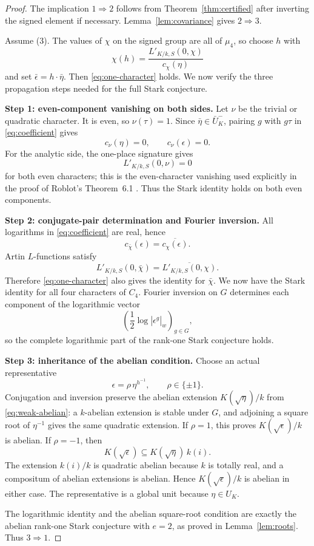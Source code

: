 \documentclass[11pt]{article}
\newcommand{\Lprime}{L'_{K/k,S}}
\begin{document}
\begin{proof}
The implication \(1\Rightarrow2\) follows from
Theorem~\ref{thm:certified} after inverting the signed element if
necessary.  Lemma~\ref{lem:covariance} gives \(2\Rightarrow3\).

Assume (3).  The values of \(\chi\) on the signed group are all of
\(\mu_4\), so choose \(h\) with
\[
\chi(h)=\frac{\Lprime(0,\chi)}{c_\chi(\eta)}
\]
and set \(\bar\epsilon=h\mathbin{\cdot}\bar\eta\).  Then
\eqref{eq:one-character} holds.  We now verify the three propagation
steps needed for the full Stark conjecture.

\smallskip
\noindent\textbf{Step 1: even-component vanishing on both sides.}
Let \(\nu\) be the trivial or quadratic character.  It is even, so
\(\nu(\tau)=1\).  Since \(\bar\eta\in\bar U_K^-\), pairing \(g\) with
\(g\tau\) in \eqref{eq:coefficient} gives
\[
c_\nu(\eta)=0,
\qquad
c_\nu(\epsilon)=0.
\]
For the analytic side, the one-place signature gives
\[
\Lprime(0,\nu)=0
\]
for both even characters; this is the even-character vanishing used
explicitly in the proof of Roblot's Theorem~6.1
\cite[p.~405]{Roblot2013}.  Thus the Stark identity holds on both even
components.

\smallskip
\noindent\textbf{Step 2: conjugate-pair determination and Fourier
inversion.}
All logarithms in \eqref{eq:coefficient} are real, hence
\[
c_{\bar\chi}(\epsilon)=\overline{c_\chi(\epsilon)}.
\]
Artin \(L\)-functions satisfy
\[
\Lprime(0,\bar\chi)
=\overline{\Lprime(0,\chi)}.
\]
Therefore \eqref{eq:one-character} also gives the identity for
\(\bar\chi\).  We now have the Stark identity for all four characters
of \(C_4\).  Fourier inversion on \(G\) determines each component of
the logarithmic vector
\[
\left(\frac12\log|\epsilon^g|_w\right)_{g\in G},
\]
so the complete logarithmic part of the rank-one Stark conjecture
holds.

\smallskip
\noindent\textbf{Step 3: inheritance of the abelian condition.}
Choose an actual representative
\[
\epsilon=\rho\,\eta^{h^{-1}},
\qquad \rho\in\{\pm1\}.
\tag{10}\label{eq:representative}
\]
Conjugation and inversion preserve the abelian extension
\(K(\sqrt\eta)/k\) from \eqref{eq:weak-abelian}: a \(k\)-abelian
extension is stable under \(G\), and adjoining a square root of
\(\eta^{-1}\) gives the same quadratic extension.  If \(\rho=1\),
this proves \(K(\sqrt\epsilon)/k\) is abelian.  If \(\rho=-1\), then
\[
K(\sqrt\epsilon)
\subseteq K(\sqrt\eta)\,k(i).
\]
The extension \(k(i)/k\) is quadratic abelian because \(k\) is totally
real, and a compositum of abelian extensions is abelian.  Hence
\(K(\sqrt\epsilon)/k\) is abelian in either case.  The representative
is a global unit because \(\eta\in U_K\).

The logarithmic identity and the abelian square-root condition are
exactly the abelian rank-one Stark conjecture with \(e=2\), as proved
in Lemma~\ref{lem:roots}.  Thus \(3\Rightarrow1\).
\end{proof}
\end{document}
